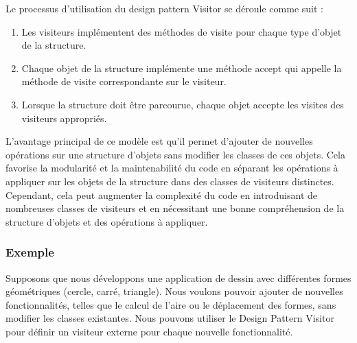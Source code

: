 Le processus d'utilisation du design pattern Visitor se déroule comme suit :

\begin{enumerate}[leftmargin=*,labelsep=3mm]
    \item Les visiteurs implémentent des méthodes de visite pour chaque type d'objet de la structure.
    \item Chaque objet de la structure implémente une méthode accept qui appelle la méthode de visite correspondante sur le visiteur.
    \item Lorsque la structure doit être parcourue, chaque objet accepte les visites des visiteurs appropriés.
\end{enumerate}

L'avantage principal de ce modèle est qu'il permet d'ajouter de nouvelles opérations sur une structure d'objets sans modifier les classes de ces objets. Cela favorise la modularité et la maintenabilité du code en séparant les opérations à appliquer sur les objets de la structure dans des classes de visiteurs distinctes. Cependant, cela peut augmenter la complexité du code en introduisant de nombreuses classes de visiteurs et en nécessitant une bonne compréhension de la structure d'objets et des opérations à appliquer.


\subsubsection{Exemple}

Supposons que nous développons une application de dessin avec différentes formes géométriques (cercle, carré, triangle). Nous voulons pouvoir ajouter de nouvelles fonctionnalités, telles que le calcul de l'aire ou le déplacement des formes, sans modifier les classes existantes. Nous pouvons utiliser le Design Pattern Visitor pour définir un visiteur externe pour chaque nouvelle fonctionnalité.




